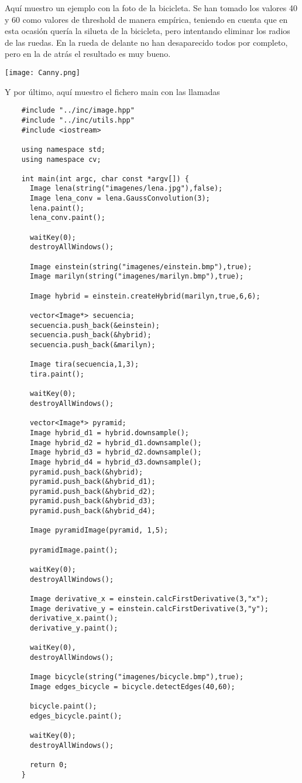 \documentclass[a4paper, 11pt]{article}
\theoremstyle{definition}
\begin{document}
  Aquí muestro un ejemplo con la foto de la bicicleta. Se han tomado los valores
  40 y 60 como valores de threshold de manera empírica, teniendo en cuenta que
  en esta ocasión quería la silueta de la bicicleta, pero intentando eliminar los
  radios de las ruedas. En la rueda de delante no han desaparecido todos por completo,
  pero en la de atrás el resultado es muy bueno.


  \centerline{\texttt{[image: Canny.png]}}

  Y por último, aquí muestro el fichero main con las llamadas

  \begin{lstlisting}
    #include "../inc/image.hpp"
    #include "../inc/utils.hpp"
    #include <iostream>

    using namespace std;
    using namespace cv;

    int main(int argc, char const *argv[]) {
      Image lena(string("imagenes/lena.jpg"),false);
      Image lena_conv = lena.GaussConvolution(3);
      lena.paint();
      lena_conv.paint();

      waitKey(0);
      destroyAllWindows();

      Image einstein(string("imagenes/einstein.bmp"),true);
      Image marilyn(string("imagenes/marilyn.bmp"),true);

      Image hybrid = einstein.createHybrid(marilyn,true,6,6);

      vector<Image*> secuencia;
      secuencia.push_back(&einstein);
      secuencia.push_back(&hybrid);
      secuencia.push_back(&marilyn);

      Image tira(secuencia,1,3);
      tira.paint();

      waitKey(0);
      destroyAllWindows();

      vector<Image*> pyramid;
      Image hybrid_d1 = hybrid.downsample();
      Image hybrid_d2 = hybrid_d1.downsample();
      Image hybrid_d3 = hybrid_d2.downsample();
      Image hybrid_d4 = hybrid_d3.downsample();
      pyramid.push_back(&hybrid);
      pyramid.push_back(&hybrid_d1);
      pyramid.push_back(&hybrid_d2);
      pyramid.push_back(&hybrid_d3);
      pyramid.push_back(&hybrid_d4);

      Image pyramidImage(pyramid, 1,5);

      pyramidImage.paint();

      waitKey(0);
      destroyAllWindows();

      Image derivative_x = einstein.calcFirstDerivative(3,"x");
      Image derivative_y = einstein.calcFirstDerivative(3,"y");
      derivative_x.paint();
      derivative_y.paint();

      waitKey(0),
      destroyAllWindows();

      Image bicycle(string("imagenes/bicycle.bmp"),true);
      Image edges_bicycle = bicycle.detectEdges(40,60);

      bicycle.paint();
      edges_bicycle.paint();

      waitKey(0);
      destroyAllWindows();

      return 0;
    }
  \end{lstlisting}
\end{document}
